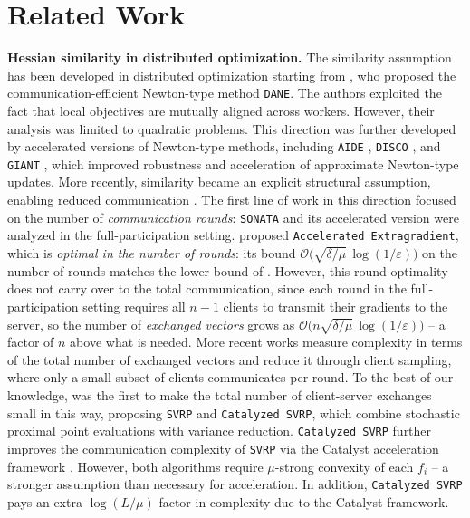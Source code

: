 \documentclass{article}
\begin{document}
\section{Related Work} 
\textbf{Hessian similarity in distributed optimization.} The similarity 
assumption has been developed in distributed optimization starting from 
\cite{shamir2014communication}, who proposed the communication-efficient 
Newton-type method \texttt{DANE}. The authors exploited the fact that local 
objectives are mutually aligned across workers. However, their analysis was 
limited to quadratic problems. This direction was further developed by 
accelerated versions of Newton-type methods, including \texttt{AIDE} 
\cite{reddi2016aide}, \texttt{DISCO} \cite{pmlr-v37-zhangb15}, and 
\texttt{GIANT} \cite{wang2018giant}, which improved robustness and 
acceleration of approximate Newton-type updates. More recently, similarity 
became an explicit structural assumption, enabling reduced communication 
\cite{tian2022acceleration}. The first line of work in this direction 
focused on the number of \textit{communication rounds}: \texttt{SONATA} 
\cite{sun2022distributed} and its accelerated version 
\cite{tian2022acceleration} were analyzed in the full-participation setting. 
\cite{kovalev2022optimal} proposed \texttt{Accelerated Extragradient}, which is \textit{optimal in the number of rounds}: its bound $\mathcal{O}\bigl(\sqrt{\delta/\mu} \, \log(1/ \varepsilon) \bigr)$ 
on the number of rounds matches the lower bound of 
\cite{arjevani2015communication}. However, this round-optimality does not carry over to the total communication, since each round in the 
full-participation setting requires all $n-1$ clients to transmit their 
gradients to the server, so the number of \textit{exchanged vectors} grows as 
$\mathcal{O}\bigl(n\sqrt{\delta/\mu} \, \log(1/ \varepsilon)\bigr)$ -- a factor of $n$ above what is needed. More recent works 
measure complexity in terms of the total number of exchanged vectors and 
reduce it through client sampling, where only a small subset of clients 
communicates per round. To the best of our knowledge, \cite{khaled2022faster} was the first to 
make the total number of client-server exchanges small in this way, 
proposing \texttt{SVRP} and \texttt{Catalyzed SVRP}, which combine 
stochastic proximal point evaluations with variance reduction. 
\texttt{Catalyzed SVRP} further improves the communication complexity of 
\texttt{SVRP} via the Catalyst acceleration framework \cite{lin2015universal}. However, 
both algorithms require $\mu$-strong convexity of each $f_i$ -- a stronger assumption than necessary for acceleration. In addition, 
\texttt{Catalyzed SVRP} pays an extra $\log(L/\mu)$ factor in complexity 
due to the Catalyst framework.
\end{document}
